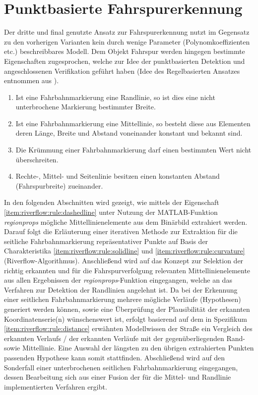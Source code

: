 \chapter{Punktbasierte Fahrspurerkennung \dcsecondauthorshort} 
\label{sec:fahrspurerkennung:riverflow}

Der dritte und final genutzte Ansatz zur Fahrspurerkennung nutzt im Gegensatz zu den vorherigen Varianten kein durch wenige Parameter (Polynomkoeffizienten etc.) beschreibbares Modell. Dem Objekt Fahrspur werden hingegen bestimmte Eigenschaften zugesprochen, welche zur Idee der punktbasierten Detektion und angeschlossenen Verifikation geführt haben (Idee des Regelbasierten Ansatzes entnommen aus \autocite[35-39]{drauschkeEchtzeitfaehigeStartpunktalgorithmenFuer2016}).
\begin{enumerate}
\item \label{item:riverflow:rule:solidline}
Ist eine Fahrbahnmarkierung eine Randlinie, so ist dies eine nicht unterbrochene Markierung bestimmter Breite.
\item \label{item:riverflow:rule:dashedline}
Ist eine Fahrbahnmarkierung eine Mittellinie, so besteht diese aus Elementen deren Länge, Breite und Abstand voneinander konstant und bekannt sind.
\item \label{item:riverflow:rule:curvature}
Die Krümmung einer Fahrbahnmarkierung darf einen bestimmten Wert nicht überschreiten.
\item \label{item:riverflow:rule:distance}
Rechte-, Mittel- und Seitenlinie besitzen einen konstanten Abstand (Fahrspurbreite) zueinander.
\end{enumerate}
In den folgenden Abschnitten wird gezeigt, wie mittels der Eigenschaft \ref{item:riverflow:rule:dashedline} unter Nutzung der MATLAB-Funktion \emph{regionprops} mögliche Mittellinienelemente aus dem Binärbild extrahiert werden. Darauf folgt die Erläuterung einer iterativen Methode zur Extraktion für die seitliche Fahrbahnmarkierung repräsentativer Punkte auf Basis der Charakteristika \ref{item:riverflow:rule:solidline} und \ref{item:riverflow:rule:curvature} (\glqq Riverflow-Algorithmus\grqq ). Anschließend wird auf das Konzept zur Selektion der richtig erkannten und für die Fahrspurverfolgung relevanten Mittellinienelemente aus allen Ergebnissen der \emph{regionprops}-Funktion eingegangen, welche an das Verfahren zur Detektion der Randlinien angelehnt ist. Da bei der Erkennung einer seitlichen Fahrbahnmarkierung mehrere mögliche Verläufe (\glqq Hypothesen\grqq ) generiert werden können, sowie eine Überprüfung der Plausibilität der erkannten Koordinatenserie(n) wünschenswert ist, erfolgt basierend auf dem in Spezifikum \ref{item:riverflow:rule:distance} erwähnten Modellwissen der Straße ein Vergleich des erkannten Verlaufs / der erkannten Verläufe mit der gegenüberliegenden Rand- sowie Mittellinie. Eine Auswahl der längsten zu den übrigen extrahierten Punkten passenden Hypothese kann somit stattfinden. Abschließend wird auf den Sonderfall einer unterbrochenen seitlichen Fahrbahnmarkierung eingegangen, dessen Bearbeitung sich aus einer Fusion der für die Mittel- und Randlinie implementierten Verfahren ergibt.




